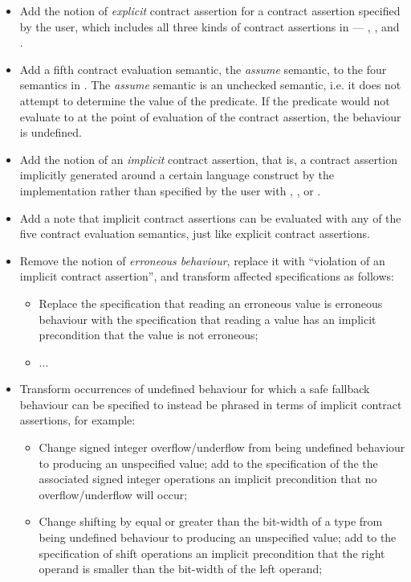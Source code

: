 \begin{itemize}
\item Add the notion of \emph{explicit} contract assertion for a contract assertion specified by the user, which includes all three kinds of contract assertions in \cite{P2900R8} --- , , and .
\item Add a fifth contract evaluation semantic, the \emph{assume} semantic, to the four semantics in \cite{P2900R8}. The  \emph{assume} semantic is an unchecked semantic, i.e. it does not attempt to determine the value of the predicate. If the predicate would not evaluate to  at the point of evaluation of the contract assertion, the behaviour is undefined.
\item Add the notion of an \emph{implicit} contract assertion, that is, a contract assertion implicitly generated around a certain language construct by the implementation rather than specified by the user with , , or .
\item Add a note that implicit contract assertions can be evaluated with any of the five contract evaluation semantics, just like explicit contract assertions.
\item Remove the notion of \emph{erroneous behaviour}, replace it with ``violation of an implicit contract assertion'', and transform affected specifications as follows:
\begin{itemize}
\item Replace the specification that reading an erroneous value is erroneous behaviour with the specification that reading a value has an implicit precondition that the value is not erroneous;
\item ...
\end{itemize}
\item Transform occurrences of undefined behaviour for which a safe fallback behaviour can be specified to instead be phrased in terms of implicit contract assertions, for example:
\begin{itemize}
\item Change signed integer overflow/underflow from being undefined behaviour to producing an unspecified value; add to the specification of the the associated signed integer operations an implicit precondition that no overflow/underflow will occur;
\item Change shifting by equal or greater than the bit-width of a type from being undefined behaviour to producing an unspecified value; add to the specification of shift operations an implicit precondition that the right operand is smaller than the bit-width of the left operand;

\end{itemize}
\end{itemize}
